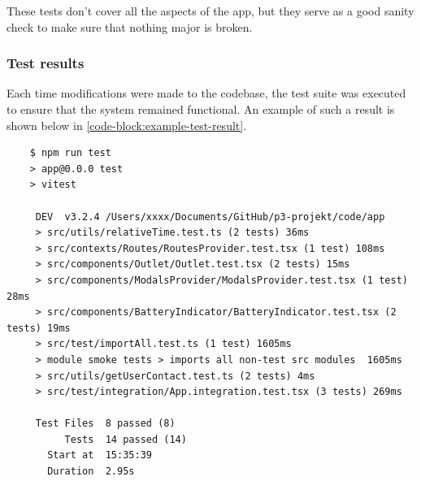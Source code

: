 These tests don't cover all the aspects of the app, but they serve as a good sanity check to make sure that nothing major is broken.

\subsubsection{Test results}
Each time modifications were made to the codebase, the test suite was executed to ensure that the system remained functional. An example of such a result is shown below in \autoref{code-block:example-test-result}.


\clearpage
\begin{codeblock}
    \caption{Example test results}
    \label{code-block:example-test-result}
    \begin{verbatim}
    $ npm run test
    > app@0.0.0 test
    > vitest
    
     DEV  v3.2.4 /Users/xxxx/Documents/GitHub/p3-projekt/code/app
     > src/utils/relativeTime.test.ts (2 tests) 36ms
     > src/contexts/Routes/RoutesProvider.test.tsx (1 test) 108ms
     > src/components/Outlet/Outlet.test.tsx (2 tests) 15ms
     > src/components/ModalsProvider/ModalsProvider.test.tsx (1 test) 28ms
     > src/components/BatteryIndicator/BatteryIndicator.test.tsx (2 tests) 19ms
     > src/test/importAll.test.ts (1 test) 1605ms
     > module smoke tests > imports all non-test src modules  1605ms
     > src/utils/getUserContact.test.ts (2 tests) 4ms
     > src/test/integration/App.integration.test.tsx (3 tests) 269ms
    
     Test Files  8 passed (8)
          Tests  14 passed (14)
       Start at  15:35:39
       Duration  2.95s
    \end{verbatim}
\end{codeblock}

